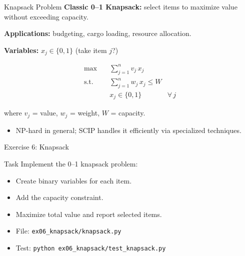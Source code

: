 \documentclass[aspectratio=169,10pt]{beamer}
\begin{document}
\begin{frame}{Knapsack Problem}
\textbf{Classic 0--1 Knapsack:} select items to maximize value
without exceeding capacity.

\medskip
\textbf{Applications:} budgeting, cargo loading, resource allocation.

\medskip
\textbf{Variables:} $x_j \in \{0,1\}$ (take item $j$?)

\begin{align*}
  \max \quad & \sum_{j=1}^{n} v_j \, x_j \\
  \text{s.t.} \quad
    & \sum_{j=1}^{n} w_j \, x_j \le W \\
    & x_j \in \{0,1\} & \forall\, j
\end{align*}

where $v_j$ = value, $w_j$ = weight, $W$ = capacity.

\medskip
\begin{itemize}
  \item NP-hard in general; SCIP handles it efficiently via specialized techniques.
\end{itemize}
\end{frame}

\begin{frame}{Exercise 6: Knapsack}
\begin{block}{Task}
Implement the 0--1 knapsack problem:
\begin{itemize}
  \item Create binary variables for each item.
  \item Add the capacity constraint.
  \item Maximize total value and report selected items.
\end{itemize}
\end{block}
\begin{itemize}
  \item File: \texttt{ex06\_knapsack/knapsack.py}
  \item Test: \texttt{python ex06\_knapsack/test\_knapsack.py}
\end{itemize}
\end{frame}
\end{document}
